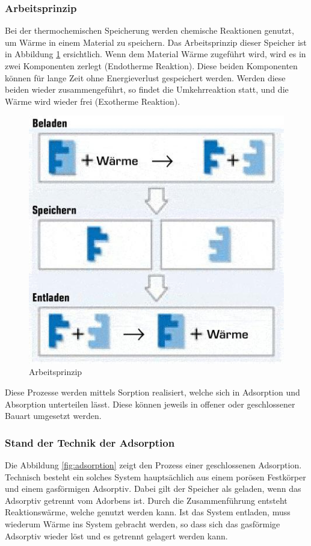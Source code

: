 \documentclass[11pt,a4paper]{scrartcl}
\begin{document}
\subsubsection{Arbeitsprinzip}
Bei der thermochemischen Speicherung werden chemische Reaktionen genutzt, um
Wärme in einem Material zu speichern. Das Arbeitsprinzip dieser Speicher ist in
Abbildung \ref{fig:ladenspeichernentladens} ersichtlich. Wenn dem Material Wärme
zugeführt wird, wird es in zwei Komponenten zerlegt (Endotherme Reaktion). Diese beiden Komponenten
können für lange Zeit ohne Energieverlust gespeichert werden. Werden diese
beiden wieder zusammengeführt, so findet die Umkehrreaktion statt, und die Wärme
wird wieder frei (Exotherme Reaktion).

\begin{figure}[h!]
\begin{center}
\includegraphics[scale=0.6]{images/ladenspeichernentladen.jpg}
\caption{Arbeitsprinzip \cite{ladenspeichernentladen}}
\label{fig:ladenspeichernentladens}
\end{center}
\end{figure}

Diese Prozesse werden mittels Sorption realisiert, welche sich 
in Adsorption und Absorption unterteilen lässt. Diese können jeweils in
offener oder geschlossener Bauart umgesetzt werden.

\subsubsection{Stand der Technik der Adsorption}
Die Abbildung \ref{fig:adsorption} zeigt den Prozess einer geschlossenen
Adsorption. Technisch besteht ein solches System hauptsächlich aus einem porösen
Festkörper und einem gasförmigen Adsorptiv. Dabei gilt der Speicher als geladen,
wenn das Adsorptiv getrennt vom Adorbens ist. Durch die Zusammenführung entsteht
Reaktionswärme, welche genutzt werden kann. Ist das System entladen, muss
wiederum Wärme ins System gebracht werden, so dass sich das gasförmige Adsorptiv
wieder löst und es getrennt gelagert werden kann.
\end{document}
